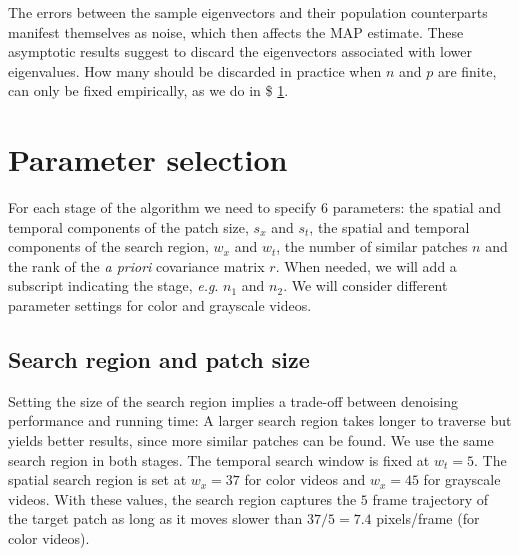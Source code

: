 \documentclass[10pt, journal, twocolumn, final, a4paper]{IEEEtran}
\newcommand{\pcomment}[1]{}
\newcommand{\eg}{\emph{e.g}. } \newcommand{\Eg}{\emph{E.g}. }
\begin{document}
The errors between the sample eigenvectors and their population
counterparts manifest themselves as noise, which then affects the MAP estimate.
%
These asymptotic results suggest to discard the eigenvectors associated with 
lower eigenvalues. How many should be discarded in practice when $n$ and $p$ are finite, 
can only be fixed empirically, as we do in \$ \ref{sec:parameters}.

\pcomment{Results of Bunea are still missing!}
\pcomment{More detailed explanation of the results?}

\section{Parameter selection}
\label{sec:parameters}

For each stage of the algorithm we need to specify 6 parameters: the spatial
and temporal components of the patch size, $s_x$ and $s_t$, the spatial and
temporal components of the search region, $w_x$ and $w_t$, the number of similar
patches $n$ and the rank of the \textit{a priori} covariance matrix $r$.
When needed, we will add a subscript indicating the stage, \eg
$n_{1}$ and $n_{2}$.
We will consider different parameter settings for color and grayscale videos.

\subsection{Search region and patch size}

Setting the size of the search region implies a trade-off between denoising
performance and running time: A larger search region takes longer to traverse
but yields better results, since more similar patches can be found. We use the same 
search region in both stages. The
temporal search window is fixed at $w_t = 5$. The spatial search region is set at
$w_x = 37$ for color videos and $w_x = 45$ for grayscale videos.
With these values, the search region captures the $5$ frame trajectory of the
target patch as long as it moves slower than $37/5 = 7.4$ pixels/frame (for
color videos).
\end{document}
